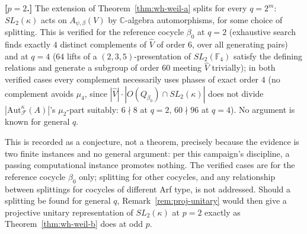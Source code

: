 \statusConjecture
\begin{conjecture}
\label{conj:wh-weil-e}
\textbf{[$p=2$.]} The extension of Theorem~\ref{thm:wh-weil-a} splits for
every $q=2^m$: $SL_2(\kappa)$ acts on $A_{\psi,\beta}(V)$ by
$\mathbb{C}$-algebra automorphisms, for some choice of splitting. This is
verified for the reference cocycle $\beta_0$ at $q=2$ (exhaustive search
finds exactly $4$ distinct complements of $\hat V$ of order $6$, over all
generating pairs) and at $q=4$ ($64$ lifts of a $(2,3,5)$-presentation of
$SL_2(\mathbb{F}_4)$ satisfy the defining relations and generate a subgroup
of order $60$ meeting $\hat V$ trivially); in both verified cases every
complement necessarily uses phases of exact order $4$ (no complement avoids
$\mu_4$, since $|\hat V|\cdot|O(Q_{\beta_0})\cap SL_2(\kappa)|$ does not
divide $|\mathrm{Aut}_{\mathcal{F}}^\kappa(A)|$'s $\mu_2$-part suitably: $6\nmid 8$
at $q=2$, $60\nmid 96$ at $q=4$). No argument is known for general $q$.
\end{conjecture}

\begin{scope}
This is recorded as a conjecture, not a theorem, precisely because the
evidence is two finite instances and no general argument: per this
campaign's discipline, a passing computational instance promotes nothing.
The verified cases are for the reference cocycle $\beta_0$ only; splitting
for other cocycles, and any relationship between splittings for cocycles of
different Arf type, is not addressed. Should a splitting be found for
general $q$, Remark~\ref{rem:proj-unitary} would then give a projective
unitary representation of $SL_2(\kappa)$ at $p=2$ exactly as
Theorem~\ref{thm:wh-weil-b} does at odd $p$.
\end{scope}


